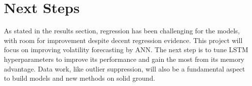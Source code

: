 \documentclass[letterpaper,11pt]{article}
\begin{document}
\section{Next Steps}

As stated in the results section, regression has been challenging for the models, with room for improvement despite decent regression evidence. This project will focus on improving volatility forecasting by ANN. The next step is to tune LSTM hyperparameters to improve its performance and gain the most from its memory advantage. Data work, like outlier suppression, will also be a fundamental aspect to build models and new methods on solid ground.
\end{document}
